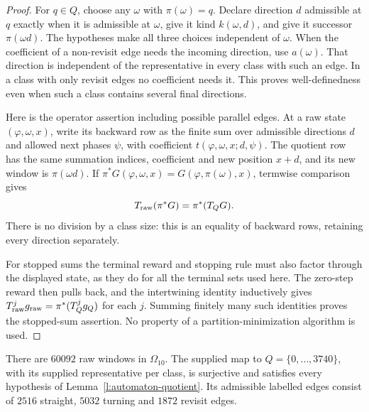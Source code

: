 \begin{proof}
For \(q\in Q\), choose any \(\omega\) with \(\pi(\omega)=q\).
Declare direction \(d\) admissible at \(q\) exactly when it is
admissible at \(\omega\), give it kind \(k(\omega,d)\), and give
it successor \(\pi(\omega d)\). The hypotheses make all three
choices independent of \(\omega\). When the coefficient of a
non-revisit edge needs the incoming direction, use \(a(\omega)\).
That direction is independent of the representative in every class
with such an edge. In a class with only revisit edges no coefficient
needs it. This proves well-definedness even when such a class
contains several final directions.

Here is the operator assertion including possible parallel edges.
At a raw state \((\varphi,\omega,x)\), write its backward row as
the finite sum over admissible directions \(d\) and allowed next
phases \(\psi\), with coefficient
\(t(\varphi,\omega,x;d,\psi)\). The quotient row has the same
summation indices, coefficient and new position \(x+d\), and its
new window is \(\pi(\omega d)\). If
\(\pi^*G(\varphi,\omega,x)=G(\varphi,\pi(\omega),x)\), termwise
comparison gives
\[
 T_{\rm raw}(\pi^*G)=\pi^*(T_QG).
\]
There is no division by a class size: this is an equality of
backward rows, retaining every direction separately.

For stopped sums the terminal reward and stopping rule must also
factor through the displayed state, as they do for all the terminal
sets used here. The zero-step reward then pulls back, and the
intertwining identity inductively gives
\(T_{\rm raw}^jg_{\rm raw}=\pi^*(T_Q^jg_Q)\) for each \(j\).
Summing finitely many such identities proves the stopped-sum
assertion. No property of a partition-minimization algorithm is used.
\end{proof}

\begin{proposition}\label{p:automaton10}
There are \(60092\) raw windows in \(\Omega_{10}\).
The supplied map to \(Q=\{0,\ldots,3740\}\), with its supplied
representative per class, is surjective and satisfies every
hypothesis of Lemma~\ref{l:automaton-quotient}.
Its admissible labelled edges consist of \(2516\) straight,
\(5032\) turning and \(1872\) revisit edges.
\end{proposition}

